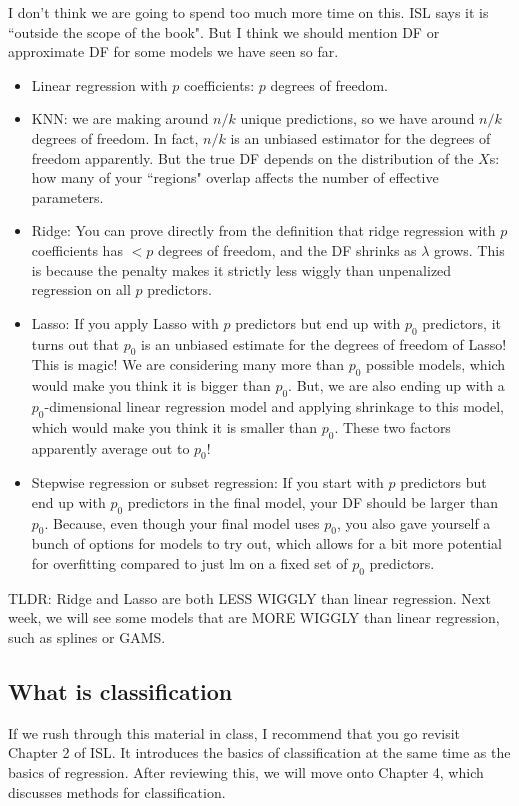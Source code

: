 I don't think we are going to spend too much more time on this. ISL says it is ``outside the scope of the book". But I think we should mention DF or approximate DF for some models we have seen so far. 
\begin{itemize}
\item Linear regression with $p$ coefficients: $p$ degrees of freedom. 
\item KNN: we are making around $n/k$ unique predictions, so we have around $n/k$ degrees of freedom. In fact, $n/k$ is an unbiased estimator for the degrees of freedom apparently. But the true DF depends on the distribution of the $X$s: how many of your ``regions" overlap affects the number of effective parameters. 
\item Ridge: You can prove directly from the definition that ridge regression with $p$ coefficients has $< p$ degrees of freedom, and the DF shrinks as $\lambda$ grows. This is because the penalty makes it strictly less wiggly than unpenalized regression on all $p$ predictors. 
\item Lasso: If you apply Lasso with $p$ predictors but end up with $p_0$ predictors, it turns out that $p_0$ is an unbiased estimate for the degrees of freedom of Lasso! This is magic! We are considering many more than $p_0$ possible models, which would make you think it is bigger than $p_0$. But, we are also ending up with a $p_0$-dimensional linear regression model and applying shrinkage to this model, which would make you think it is smaller than $p_0$. These two factors apparently average out to $p_0$! 
\item Stepwise regression or subset regression: If you start with $p$ predictors but end up with $p_0$ predictors in the final model, your DF should be larger than $p_0$. Because, even though your final model uses $p_0$, you also gave yourself a bunch of options for models to try out, which allows for a bit more potential for overfitting compared to just lm on a fixed set of $p_0$ predictors. 
\end{itemize}

TLDR: Ridge and Lasso are both LESS WIGGLY than linear regression. Next week, we will see some models that are MORE WIGGLY than linear regression, such as splines or GAMS. 

\subsection{What is classification}

If we rush through this material in class, I recommend that you go revisit Chapter 2 of ISL. It introduces the basics of classification at the same time as the basics of regression. After reviewing this, we will move onto Chapter 4, which discusses methods for classification.

